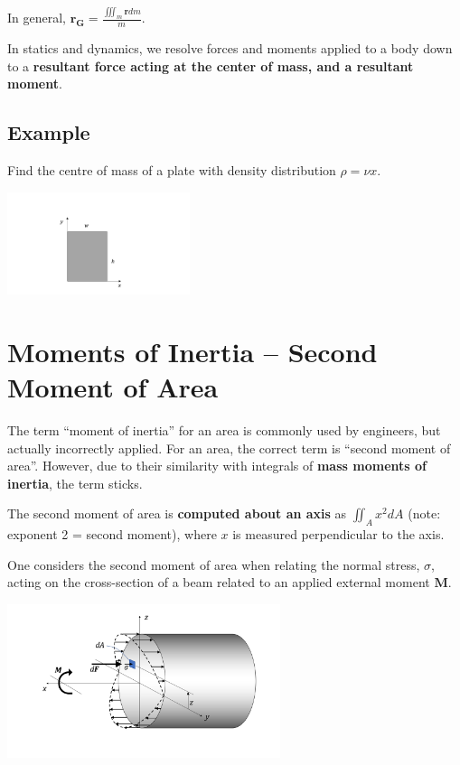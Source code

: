 \documentclass[12pt,letterpaper,twoside]{report}
\begin{document}
In general, $\displaystyle \bm{r_G} = \frac{\iiint_m \bm{r} dm }{m}$. 

In statics and dynamics, we resolve forces and moments applied to a body down to a \textbf{resultant force acting at the center of mass, and a resultant moment}.  

\newpage

\subsection{Example}

Find the centre of mass of a plate with density distribution $\rho = \nu x$. 

\includegraphics[trim={8cm 1cm 5cm 4cm},clip,width=0.4\textwidth, left]{Slide40} 

\vspace*{20\baselineskip}

\newpage

\section{Moments of Inertia – Second Moment of Area}
The term “moment of inertia” for an area is commonly used by engineers, but actually incorrectly applied.  For an area, the correct term is “second moment of area”.  However, due to their similarity with integrals of \textbf{mass moments of inertia}, the term sticks. 

The second moment of area is \textbf{computed about an axis} as $\displaystyle  \iint_A x^2 dA$ (note: exponent 2 = second moment), where $x$ is measured perpendicular to the axis.  

One considers the second moment of area when relating the normal stress, $\sigma$, acting on the cross-section of a beam related to an applied external moment $\bm{M}$.  

\includegraphics[trim={2.5cm 1cm 1cm 1cm},clip,width=0.6\textwidth, left]{Slide41} 
\end{document}
